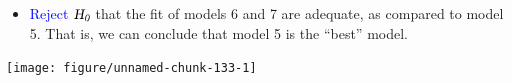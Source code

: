 \documentclass[oneside]{book}\usepackage[]{graphicx}\usepackage[svgnames]{xcolor}
\newenvironment{knitrout}{}{} %
\newcommand{\HN}{\textsl{H}_{\textsl{0}}}%
\begin{document}
\begin{itemize}
      \item \textcolor{Blue}{Reject} $ \HN $ that the fit of models 6 and 7 are adequate, as compared to model 5. That is,
            we can conclude that model 5 is the ``best'' model.
\end{itemize}
\begin{knitrout}
\color{fgcolor}

{\centering \texttt{[image: figure/unnamed-chunk-133-1]} 

}


\end{knitrout}
\end{document}
